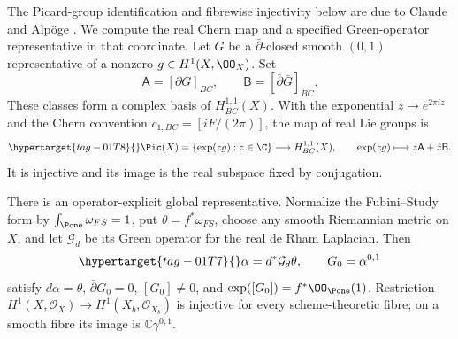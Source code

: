 \begin{proposition}\hypertarget{tag-01SE}{}\label{inv:C3.1}\label{wb:cor:picard-line-audit}

The Picard-group identification and fibrewise injectivity below are due to Claude and Alp\"oge \cite[Theorem~10.5(b), proof Steps~1 and~4, p.~88]{AC2026}. We compute the real Chern map and a specified Green-operator representative in that coordinate. Let $G$ be a $\bar\partial$-closed smooth $(0,1)$ representative of
a nonzero $g\in H^1(X,\OO_X)$.  Set
\[
\mathsf A=[\partial G]_{BC},\qquad
\mathsf B=[\bar\partial\bar G]_{BC}.
\]
These classes form a complex basis of $H^{1,1}_{BC}(X)$.
With the exponential $z\mapsto e^{2\pi iz}$ and the Chern convention
$c_{1,BC}=[iF/(2\pi)]$, the map of real Lie groups is
\begin{equation}\hypertarget{tag-01T8}{}\label{inv:eq:C-Pic-map}
\Pic(X)=\{\exp(zg):z\in\C\}\longrightarrow H^{1,1}_{BC}(X),
\qquad \exp(zg)\longmapsto z\mathsf A+\bar z\mathsf B.
\end{equation}
It is injective and its image is the real subspace fixed by conjugation.

There is an operator-explicit global representative.  Normalize the
Fubini--Study form by $\int_{\Pone}\omega_{FS}=1$, put
$\theta=f^*\omega_{FS}$, choose any smooth Riemannian metric on $X$,
and let $\mathcal G_d$ be its Green operator for the real de Rham
Laplacian.  Then
\begin{equation}\hypertarget{tag-01T7}{}\label{inv:eq:C-G-Green}
\alpha=d^*\mathcal G_d\theta,\qquad G_0=\alpha^{0,1}
\end{equation}
satisfy $d\alpha=\theta$, $\bar\partial G_0=0$,
$[G_0]\ne0$, and $\exp([G_0])=f^*\OO_{\Pone}(1)$.
Restriction $H^1(X,\mathcal O_X)\to H^1(X_b,\mathcal O_{X_b})$ is injective for every scheme-theoretic fibre; on a smooth fibre its image is $\mathbb C\gamma^{0,1}$.
\end{proposition}


